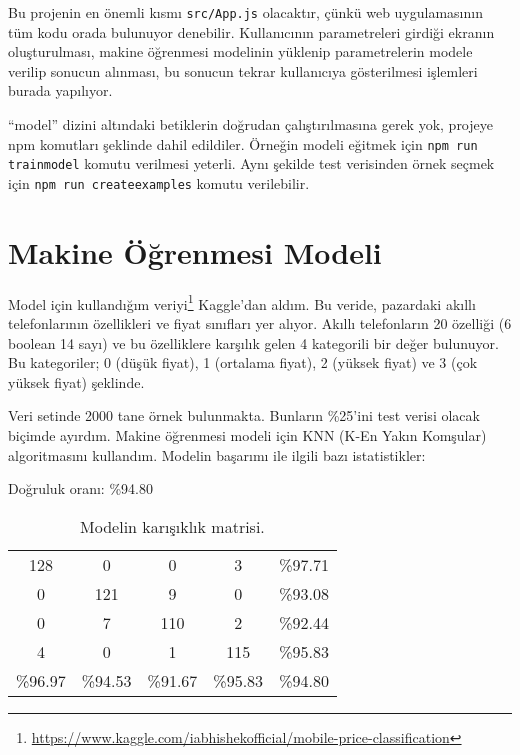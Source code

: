 \documentclass[a4paper,12pt]{article}
\begin{document}
Bu projenin en önemli kısmı \texttt{src/App.js} olacaktır, çünkü web uygulamasının tüm kodu orada bulunuyor denebilir.
Kullanıcının parametreleri girdiği ekranın oluşturulması, makine öğrenmesi modelinin yüklenip parametrelerin modele verilip sonucun alınması, bu sonucun tekrar kullanıcıya gösterilmesi işlemleri burada yapılıyor.

``model'' dizini altındaki betiklerin doğrudan çalıştırılmasına gerek yok, projeye npm komutları şeklinde dahil edildiler.
Örneğin modeli eğitmek için \texttt{npm run trainmodel} komutu verilmesi yeterli.
Aynı şekilde test verisinden örnek seçmek için \texttt{npm run createexamples} komutu verilebilir.

\newpage


\section{Makine Öğrenmesi Modeli}

Model için kullandığım veriyi\footnote{\url{https://www.kaggle.com/iabhishekofficial/mobile-price-classification}} Kaggle'dan aldım.
Bu veride, pazardaki akıllı telefonlarının özellikleri ve fiyat sınıfları yer alıyor.
Akıllı telefonların 20 özelliği (6 boolean 14 sayı) ve bu özelliklere karşılık gelen 4 kategorili bir değer bulunuyor.
Bu kategoriler; 0 (düşük fiyat), 1 (ortalama fiyat), 2 (yüksek fiyat) ve 3 (çok yüksek fiyat) şeklinde.

Veri setinde 2000 tane örnek bulunmakta. Bunların \%25'ini test verisi olacak biçimde ayırdım. Makine öğrenmesi modeli için KNN (K-En Yakın Komşular) algoritmasını kullandım. Modelin başarımı ile ilgili bazı istatistikler:

\begin{center}
Doğruluk oranı: \%94.80
\end{center}

\begin{table}[h]
 \center
 \renewcommand{\arraystretch}{1.5}
 \begin{tabular}{ cccc|c }
 128 & 0   & 0   & 3   & \%97.71 \\
 0   & 121 & 9   & 0   & \%93.08 \\
 0   & 7   & 110 & 2   & \%92.44 \\
 4   & 0   & 1   & 115 & \%95.83 \\
 \hline
 \%96.97 & \%94.53 & \%91.67 & \%95.83 & \%94.80
 \end{tabular}
 \renewcommand{\arraystretch}{1}
 \caption{Modelin karışıklık matrisi.}
\end{table}
\end{document}

